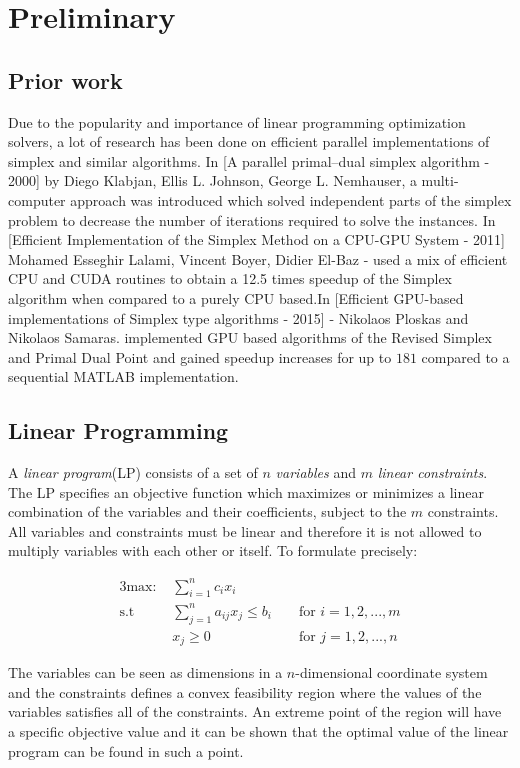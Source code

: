 \section{Preliminary}
\subsection{Prior work}
Due to the popularity and importance of linear programming optimization solvers, a lot of research has been done on efficient parallel implementations of simplex and similar algorithms. In [A parallel primal–dual simplex algorithm - 2000] by Diego Klabjan, Ellis L. Johnson, George L. Nemhauser, a multi-computer approach was introduced which solved independent parts of the simplex problem to decrease the number of iterations required to solve the instances. In [Efficient Implementation of the Simplex Method on a CPU-GPU System - 2011] Mohamed Esseghir Lalami, Vincent Boyer, Didier El-Baz - used a mix of efficient CPU and CUDA routines to obtain a 12.5 times speedup of the Simplex algorithm when compared to a purely CPU based.In [Efficient GPU-based implementations of Simplex type algorithms - 2015] - Nikolaos Ploskas and Nikolaos Samaras. implemented GPU based algorithms of the Revised Simplex and Primal Dual Point and gained speedup increases for up to $181$ compared to a sequential MATLAB implementation.

\subsection{Linear Programming}
A \textit{linear program}(LP) consists of a set of $n$ \textit{variables} and $m$ \textit{linear constraints}. The LP specifies an objective function which maximizes or minimizes a linear combination of the variables and their coefficients, subject to the $m$ constraints. All variables and constraints must be linear and therefore it is not allowed to multiply variables with each other or itself. To formulate precisely:

\begin{alignat*}{3}
\text{max: } &\sum_{i=1}^{n} c_i x_i\\
\text{s.t }  & \sum_{j=1}^{n} a_{ij} x_j \leq b_i && \text{ for } i=1,2,...,m\\
& x_j \geq 0                         && \text{ for } j=1,2,...,n
\end{alignat*}

The variables can be seen as dimensions in a $n$-dimensional coordinate system and the constraints defines a convex feasibility region where the values of the variables satisfies all of the constraints. An extreme point of the region will have a specific objective value and it can be shown that the optimal value of the linear program can be found in such a point.

